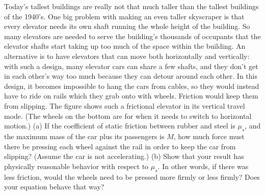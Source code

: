 Today's tallest buildings are really not that much
taller than the tallest buildings of the 1940's. One big
problem with making an even taller skyscraper is that every
elevator needs its own shaft running the whole height of the
building. So many elevators are needed to serve the
building's thousands of occupants that the elevator shafts
start taking up too much of the space within the building.
An alternative is to have elevators that can move both
horizontally and vertically: with such a design, many
elevator cars can share a few shafts, and they don't get in
each other's way too much because they can detour around
each other. In this design, it becomes impossible to hang
the cars from cables, so they would instead have to ride on
rails which they grab onto with wheels. Friction would keep
them from slipping. The figure shows such a frictional
elevator in its vertical travel mode. (The wheels on the
bottom are for when it needs to switch to horizontal
motion.)\hwendpart
 (a) If the coefficient of static friction between
rubber and steel is $\mu_s$, and the maximum mass of the car
plus its passengers is $M$, how much force must there be
pressing each wheel against the rail in order to keep the
car from slipping? (Assume the car is not accelerating.)\answercheck\hwendpart
 (b)
Show that your result has physically reasonable behavior
with respect to $\mu_s$. In other words, if there was less
friction, would the wheels need to be pressed more firmly or
less firmly? Does your equation behave that way?
